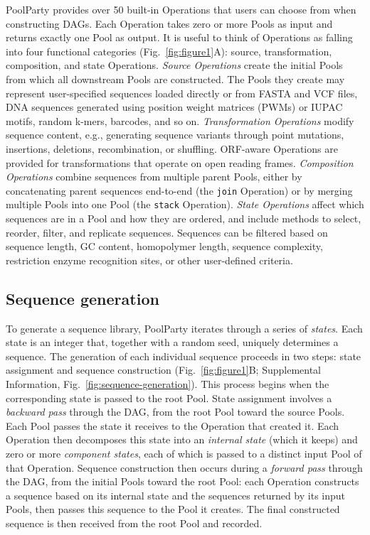 \documentclass[pdflatex,sn-vancouver-num,referee,oneside]{sn-jnl}
\newif\ifshowquoted
\newcommand{\quoted}[1]{\ifshowquoted\textcolor{quotedtext}{#1}\else#1\fi}
\begin{document}
PoolParty provides over 50 built-in Operations that users can choose from when constructing DAGs. Each Operation takes zero or more Pools as input and returns exactly one Pool as output. It is useful to think of Operations as falling into four functional categories (Fig.~\ref{fig:figure1}A): source, transformation, composition, and state Operations. \emph{Source Operations} create the initial Pools from which all downstream Pools are constructed. The Pools they create may represent user-specified sequences loaded directly or from FASTA and VCF files, DNA sequences generated using position weight matrices (PWMs) or IUPAC motifs, random k-mers, barcodes, and so on. \emph{Transformation Operations} modify sequence content, e.g., generating sequence variants through point mutations, insertions, deletions, recombination, or shuffling. ORF-aware Operations are provided for transformations that operate on open reading frames. \emph{Composition Operations} combine sequences from multiple parent Pools, either by concatenating parent sequences end-to-end (the \texttt{join} Operation) or by merging multiple Pools into one Pool (the \texttt{stack} Operation). \emph{State Operations} affect which sequences are in a Pool and how they are ordered, and include methods to select, reorder, filter, and replicate sequences. \quoted{Sequences can be filtered based on sequence length, GC content, homopolymer length, sequence complexity, restriction enzyme recognition sites, or other user-defined criteria.}

\subsection*{Sequence generation}\label{subsec:sequence-generation}

To generate a sequence library, PoolParty iterates through a series of \emph{states}. Each state is an integer that, together with a random seed, uniquely determines a sequence. The generation of each individual sequence proceeds in two steps: state assignment and sequence construction (Fig.~\ref{fig:figure1}B; Supplemental Information, Fig.~\ref{fig:sequence-generation}). This process begins when the corresponding state is passed to the root Pool. State assignment involves a \emph{backward pass} through the DAG, from the root Pool toward the source Pools. Each Pool passes the state it receives to the Operation that created it. Each Operation then decomposes this state into an \emph{internal state} (which it keeps) and zero or more \emph{component states}, each of which is passed to a distinct input Pool of that Operation. Sequence construction then occurs during a \emph{forward pass} through the DAG, from the initial Pools toward the root Pool: each Operation constructs a sequence based on its internal state and the sequences returned by its input Pools, then passes this sequence to the Pool it creates. The final constructed sequence is then received from the root Pool and recorded.
\end{document}
